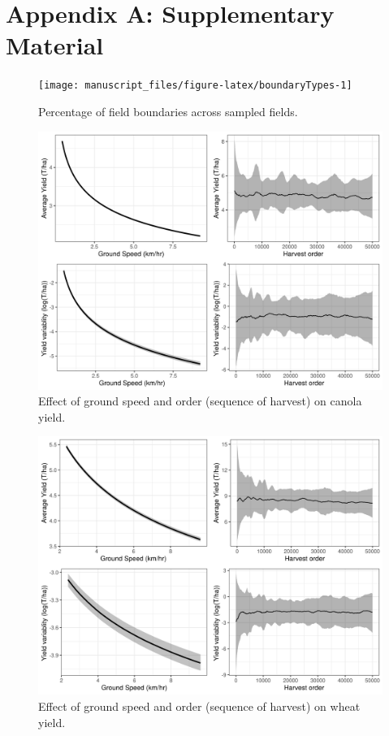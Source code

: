 \documentclass[]{elsarticle} %
\begin{document}
\newpage

\hypertarget{appendix-a-supplementary-material}{%
\section*{Appendix A: Supplementary Material}\label{appendix-a-supplementary-material}}

\begin{figure}
\texttt{[image: manuscript\_files/figure-latex/boundaryTypes-1]} \caption{Percentage of field boundaries across sampled fields.}\label{fig:boundaryTypes}
\end{figure}

\begin{figure}
\includegraphics[width=1\linewidth]{../Figures/groundSpeed_canola} \caption{Effect of ground speed and order (sequence of harvest) on canola yield.}\label{fig:canolaPlotSpeed}
\end{figure}

\begin{figure}
\includegraphics[width=1\linewidth]{../Figures/groundSpeed_wheat} \caption{Effect of ground speed and order (sequence of harvest) on wheat yield.}\label{fig:wheatPlotSpeed}
\end{figure}
\end{document}
